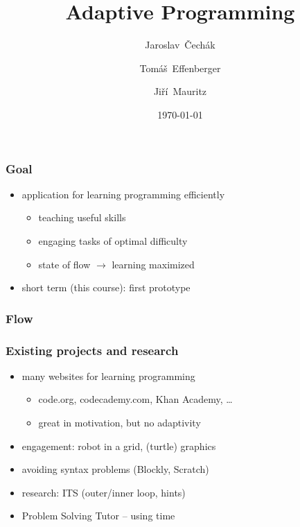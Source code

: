 \documentclass[xcolor=dvipsnames, 14pt]{beamer}
\title{Adaptive Programming}
\author{Jaroslav~Čechák \and Tomáš~Effenberger \and  Jiří~Mauritz}
\institute{Faculty of Informatics, Masaryk University}
\date{\today}
\begin{document}
\begin{frame}
\titlepage
\end{frame}

\begin{frame}
\frametitle{Goal}
\begin{itemize}
\item application for learning programming efficiently
  \begin{itemize}
  \item teaching useful skills
  \item engaging tasks of optimal difficulty
  \item state of flow $\rightarrow$ learning maximized
  \end{itemize}
\item short term (this course): first prototype
\end{itemize}
\end{frame}

\begin{frame}
\frametitle{Flow}
\begin{figure}[h]
  \centering
\end{figure}
\end{frame}

\begin{frame}
\frametitle{Existing projects and research}
\begin{itemize}
\item many websites for learning programming
  \begin{itemize}
  \item code.org, codecademy.com, Khan Academy, \ldots
  \item great in motivation, but no adaptivity
  \end{itemize}
\item engagement: robot in a grid, (turtle) graphics
\item avoiding syntax problems (Blockly, Scratch)
\item research: ITS (outer/inner loop, hints)
\item Problem Solving Tutor -- using time %
\end{itemize}
\end{frame}
\end{document}
